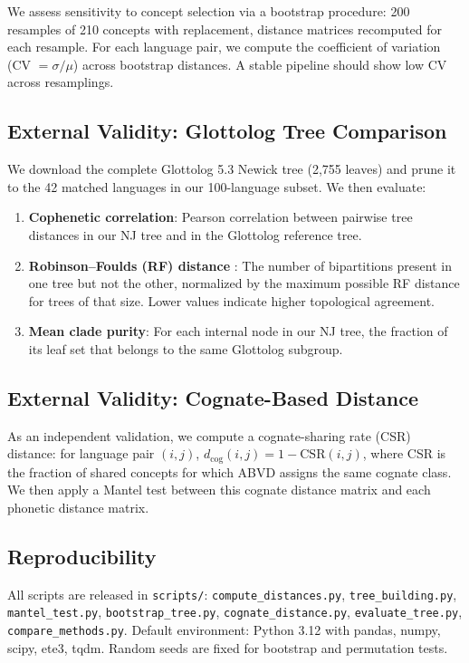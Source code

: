 \documentclass[manuscript]{clv2025}
\begin{document}
We assess sensitivity to concept selection via a bootstrap procedure: 200 resamples of 210 concepts with replacement, distance matrices recomputed for each resample. For each language pair, we compute the coefficient of variation (CV $= \sigma/\mu$) across bootstrap distances. A stable pipeline should show low CV across resamplings.

\subsection{External Validity: Glottolog Tree Comparison}

We download the complete Glottolog 5.3 Newick tree \cite{hammarstrom_glottolog4} (2{,}755 leaves) and prune it to the 42 matched languages in our 100-language subset. We then evaluate:

\begin{enumerate}
  \item \textbf{Cophenetic correlation}: Pearson correlation between pairwise tree distances in our NJ tree and in the Glottolog reference tree.
  \item \textbf{Robinson--Foulds (RF) distance} \cite{robinson1981rf}: The number of bipartitions present in one tree but not the other, normalized by the maximum possible RF distance for trees of that size. Lower values indicate higher topological agreement.
  \item \textbf{Mean clade purity}: For each internal node in our NJ tree, the fraction of its leaf set that belongs to the same Glottolog subgroup.
\end{enumerate}

\subsection{External Validity: Cognate-Based Distance}

As an independent validation, we compute a cognate-sharing rate (CSR) distance: for language pair $(i, j)$, $d_{\text{cog}}(i,j) = 1 - \text{CSR}(i,j)$, where CSR is the fraction of shared concepts for which ABVD assigns the same cognate class. We then apply a Mantel test between this cognate distance matrix and each phonetic distance matrix.

\subsection{Reproducibility}

All scripts are released in \texttt{scripts/}: \texttt{compute\_distances.py}, \texttt{tree\_building.py}, \texttt{mantel\_test.py}, \texttt{bootstrap\_tree.py}, \texttt{cognate\_distance.py}, \texttt{evaluate\_tree.py}, \texttt{compare\_methods.py}. Default environment: Python 3.12 with pandas, numpy, scipy, ete3, tqdm. Random seeds are fixed for bootstrap and permutation tests.
\end{document}

